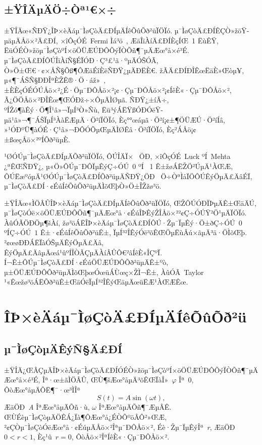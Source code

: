 \documentclass[12pt,openany,CJK,oneside]{cctbook}
\begin{document}
{\section{\kaishu ±ŸÎÄµÄÖ÷Òª¹€×÷}

±ŸÎÄœ«ÑÐŸ¿ÎÞ×èÄáµ¯ÌøÇòÄ£ÐÍµÄÍêÕûÕð²üÏÖÏó. µ¯ÌøÇòÄ£ÐÍÊÇÒ»žöŸ­µäµÄÅö×²Ä£ÐÍ, ×îÔçÓÉ\ Fermi Ìá³ö\ \cite{Fermi}, ÆäÎïÀíÄ£ÐÍÈçÍŒ\ 1 ËùÊŸ, ËüÓÉÒ»žöµ¯ÌøÇòºÍ×öÖÜÆÚÐÔÕýÏÒÕñ¶¯µÄÆœ°å×é³É. µ¯ÌøÇòÄ£ÐÍÔÚÎïÀíÑ§ÉÏÓÐ·Ç³£¹ã·ºµÄÓŠÓÃ, Ò»Ö±Œ€·¢×ÅÑ§Õß¶ÔÆäÉîÈëÑÐŸ¿µÄÐËÈ€. žÃÄ£ÐÍÐÎÊœËäÈ»Œòµ¥, µ«¶¯ÁŠÑ§ÐÐÎªÈŽÊ®·Ö·áž»\ \cite{Tufillaro,Cristina,Vogel}, ±ÈÈçÓÉÓÚÅö×²¿É·Öµ¯ÐÔÅö×²¡¢·Çµ¯ÐÔÅö×²¡¢ÍêÈ«·Çµ¯ÐÔÅö×², Ã¿ÖÖÅö×²ÐÎÊœ¶ŒÓÐž÷×ÔµÄÌØµã.  ÑÐŸ¿±íÃ÷, ºÍŽó¶àÊý·Ö¶Î¹â»¬ÏµÍ³Ò»Ñù, Ëü³ýÁËŸßÓÐÓëŸ­µä¹â»¬¶¯ÁŠÏµÍ³ÀàËÆµÄ·Ö²íÏÖÏó, Èç°°œáµã·Ö²í¡¢±¶ÖÜÆÚ·Ö²íÍâ, »¹ÓÐºÜ¶àÓÉ·Ç¹â»¬ÐÔÓÕµŒµÄÌØÊâ·Ö²íÏÖÏó, Èç²ÁÅö¡¢±ßœçÅö×²ºÍÕð²üµÈ.

¹ØÓÚµ¯ÌøÇòÄ£ÐÍµÄÕð²üÏÖÏó, ÔÚÎÄÏ×\ \cite{Luck} ÖÐ, ×îÔçÓÉ\ Luck ºÍ\ Mehta ¿ªÊŒÑÐŸ¿, µ«Ö»ÔÚµ¯ÐÔÏµÊýÇ÷ÓÚ\ 0 ºÍ \ 1 Ê±žøÁËŽÖ²ÚµÄ¹ÀŒÆ, ÔÚËæºóµÄ¹ØÓÚµ¯ÌøÇòÄ£ÐÍÕð²üµÄÑÐŸ¿ÖÐ\ \cite{Vogel,Barroso} Ö÷ÒªÌåÏÖÔÚÊýÖµÄ£ÄâÉÏ, µ¯ÌøÇòÄ£ÐÍ·¢ÉúÍêÕûÕð²üµÄÌõŒþÒ»Ö±ÎŽžø³ö.


±ŸÎÄœ«ÌÖÂÛÎÞ×èÄáµ¯ÌøÇòÄ£ÐÍµÄÍêÕûÕð²üÏÖÏó, ŒŽÔÚÓÐÏÞµÄÊ±ŒäÄÚ, µ¯ÌøÇòÓë×öÖÜÆÚÐÔÕñ¶¯µÄÆœ°å·¢ÉúÎÞÊýŽÎÅö×²²¢Ç÷ÓÚŸ²Ö¹µÄÏÖÏó. ÀûÓÃÖÐÖµ¶šÀí, žø³öÁËÎÞ×èÄáµ¯ÌøÇòÄ£ÐÍÔÚ·Žµ¯ÏµÊý·Ö±ðÇ÷ÓÚ\ $0$ ºÍÇ÷ÓÚ\ $1$ Ê±·¢ÉúÍêÕûÕð²üÊ±, ÏµÍ³²ÎÊýÓë³õÊŒÖµËùÂú×ãµÄ³ä·ÖÌõŒþ. ²¢œøÐÐÁËÏàÓŠµÄÊýÖµÄ£Äâ, ÊýÖµÄ£ÄâµÄœá¹ûºÍÎÒÃÇµÄÀíÂÛÔ€²âÍêÈ«ÎÇºÏ. Í¬Ê±ÔÚµ¯ÌøÇòÄ£ÐÍ·¢ÉúÖÜÆÚÐÔÕð²üµÄÊ±ºò, µ±ÖÜÆÚÐÔÕð²üµÄÌõŒþœÓœüÁÙœç×ŽÌ¬Ê±, ÀûÓÃ\ Taylor ¹«Êœžø³öÁËÕð²üÊ±ŒäÓëÏµÍ³²ÎÊýŒäµÄœüËÆ¹ÀŒÆÊœ.
\chapter{\heiti ÎÞ×èÄáµ¯ÌøÇòÄ£ÐÍµÄÍêÕûÕð²ü}
\section{\kaishu µ¯ÌøÇòµÄÊýÑ§Ä£ÐÍ}

±ŸÎÄ¿ŒÂÇµÄÎÞ×èÄáµ¯ÌøÇòÄ£ÐÍÓÉÒ»žöµ¯ÌøÇòºÍ×öÖÜÆÚÐÔÕýÏÒÕñ¶¯µÄÆœ°å×é³É, Îª·œ±ãÌÖÂÛ, ŒÙ¶šÆœ°åµÄ³õÊŒÏàÎ»\ $\varphi$ Îª\ 0, ÔòÆœ°åµÄÔË¶¯·œ³ÌÎª
 \begin{equation}\label{pd}
 S(t)=A\sin(\omega t),
\end{equation}
ÆäÖÐ\ \emph{A} ÎªÆœ°åµÄÕñ·ù, $\omega$ ÎªÆœ°åµÄÕñ¶¯ÆµÂÊ. ŒÙÉèµ¯ÌøÇòµÄÖÊÁ¿Ïà¶ÔÆœ°å¿ÉÒÔºöÂÔ²»ŒÆ, ²¢ÇÒµ¯ÌøÇòÓëÆœ°å·¢ÉúµÄÅö×²Îªµ¯ÐÔÅö×², Éè·Žµ¯ÏµÊýÎª\ \emph{r}, ÆäÖÐ
$0<r<1$, Èç¹û\ $r=0$, ÔòÅö×²ÎªÍêÈ«·Çµ¯ÐÔÅö×².

}
\end{document}
